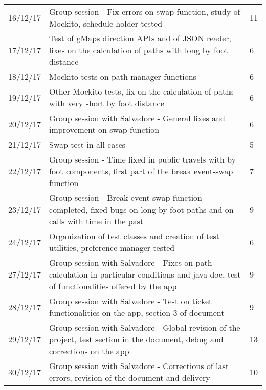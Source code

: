 \begin{longtable}{ p{2cm} p{10cm} p{3cm}}
	16/12/17 & Group session - Fix errors on swap function, study of Mockito, schedule holder tested & 11\\
	17/12/17 & Test of gMaps direction APIs and of JSON reader, fixes on the calculation of paths with long by foot distance & 6\\
	18/12/17 & Mockito tests on path manager functions & 6\\
	19/12/17 & Other Mockito tests, fix on the calculation of paths with very short by foot distance & 6\\
	20/12/17 & Group session with Salvadore - General fixes and improvement on swap function & 6\\
	21/12/17 & Swap test in all cases & 5\\
	22/12/17 & Group session - Time fixed in public travels with by foot components, first part of the break event-swap function & 7\\
	23/12/17 & Group session - Break event-swap function completed, fixed bugs on long by foot paths and on calls with time in the past & 9\\
	24/12/17 & Organization of test classes and creation of test utilities, preference manager tested & 6\\
	27/12/17 & Group session with Salvadore - Fixes on path calculation in particular conditions and java doc, test of functionalities offered by the app & 9\\
	28/12/17 & Group session with Salvadore - Test on ticket functionalities on the app, section 3 of document & 9\\
	29/12/17 & Group session with Salvadore - Global revision of the project, test section in the document, debug and corrections on the app & 13\\
	30/12/17 & Group session with Salvadore - Corrections of last errors, revision of the document and delivery & 10\\
\end{longtable}


